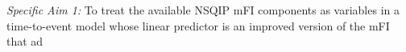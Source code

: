 \emph{Specific Aim 1:} To treat the available NSQIP mFI components as variables in a time-to-event model whose linear predictor is an improved version of the mFI that ad